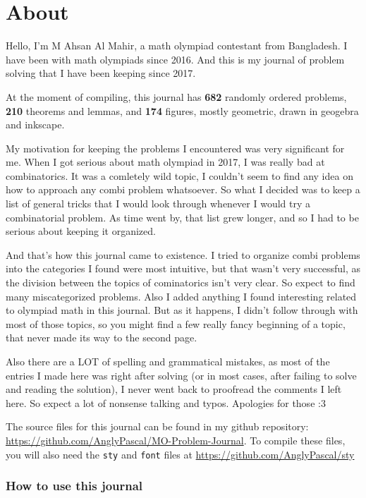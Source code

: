 \chapter*{About}  

\thispagestyle{empty}

Hello, I'm M Ahsan Al Mahir, a math olympiad contestant from Bangladesh. I have been with
math olympiads since 2016. And this is my journal of problem solving that I have been
keeping since 2017. 


At the moment of compiling, this journal has \textbf{682} randomly ordered problems,
\textbf{210} theorems and lemmas, and \textbf{174} figures, mostly geometric, drawn in
geogebra and inkscape.

My motivation for keeping the problems I encountered was very significant for me. When I
got serious about math olympiad in 2017, I was really bad at combinatorics. It was a
comletely wild topic, I couldn't seem to find any idea on how to approach any combi
problem whatsoever. So what I decided was to keep a list of general tricks that I would
look through whenever I would try a combinatorial problem. As time went by, that list grew
longer, and so I had to be serious about keeping it organized.

And that's how this journal came to existence. I tried to organize combi problems into the
categories I found were most intuitive, but that wasn't very successful, as the division
between the topics of cominatorics isn't very clear. So expect to find many miscategorized
problems. Also I added anything I found interesting related to olympiad math in this
journal. But as it happens, I didn't follow through with most of those topics, so you
might find a few really fancy beginning of a topic, that never made its way to the second
page.

Also there are a LOT of spelling and grammatical mistakes, as most of the entries I made
here was right after solving (or in most cases, after failing to solve and reading the
solution), I never went back to proofread the comments I left here. So expect a lot of
nonsense talking and typos. Apologies for those :3 

The source files for this journal can be found in my github repository:
\url{https://github.com/AnglyPascal/MO-Problem-Journal}. To compile these files, you will
also need the \texttt{sty} and \texttt{font} files at
\url{https://github.com/AnglyPascal/sty}

\subsection*{How to use this journal}

